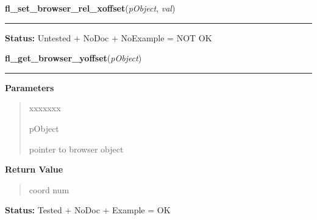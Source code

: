     \label{xformslib:library:fl_set_browser_rel_xoffset}

    \vspace{0.5ex}

\hspace{.8\funcindent}\begin{boxedminipage}{\funcwidth}

    \raggedright \textbf{fl\_set\_browser\_rel\_xoffset}(\textit{pObject}, \textit{val})

    \vspace{-1.5ex}

    \rule{\textwidth}{0.5\fboxrule}
\setlength{\parskip}{2ex}
\setlength{\parskip}{1ex}
\textbf{Status:} Untested + NoDoc + NoExample = NOT OK



    \end{boxedminipage}

    \label{xformslib:library:fl_get_browser_yoffset}

    \vspace{0.5ex}

\hspace{.8\funcindent}\begin{boxedminipage}{\funcwidth}

    \raggedright \textbf{fl\_get\_browser\_yoffset}(\textit{pObject})

    \vspace{-1.5ex}

    \rule{\textwidth}{0.5\fboxrule}
\setlength{\parskip}{2ex}
\setlength{\parskip}{1ex}
      \textbf{Parameters}
      \vspace{-1ex}

      \begin{quote}
        \begin{Ventry}{xxxxxxx}

          \item[pObject]

          pointer to browser object

        \end{Ventry}

      \end{quote}

      \textbf{Return Value}
    \vspace{-1ex}

      \begin{quote}
      coord num

      \end{quote}

\textbf{Status:} Tested + NoDoc + Example = OK



    \end{boxedminipage}


